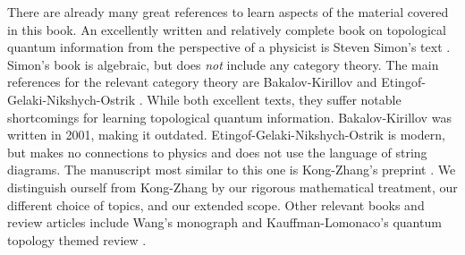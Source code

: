 There are already many great references to learn aspects of the material covered in this book. An excellently written and relatively complete book on topological quantum information from the perspective of a physicist is Steven Simon's text \cite{simon2023topological}. Simon's book is algebraic, but does{ \em not} include any category theory. The main references for the relevant category theory are Bakalov-Kirillov \cite{bakalov2001lectures} and Etingof-Gelaki-Nikshych-Ostrik \cite{etingof2016tensor}. While both excellent texts, they suffer notable shortcomings for learning topological quantum information. Bakalov-Kirillov was written in 2001, making it outdated. Etingof-Gelaki-Nikshych-Ostrik is modern, but makes no connections to physics and does not use the language of string diagrams. The manuscript most similar to this one is Kong-Zhang's preprint \cite{kong2022invitation}. We distinguish ourself from Kong-Zhang by our rigorous mathematical treatment, our different choice of topics, and our extended scope. Other relevant books and review articles include Wang's monograph \cite{wang2010topological} and Kauffman-Lomonaco's quantum topology themed review \cite{kauffman2009topological}.

